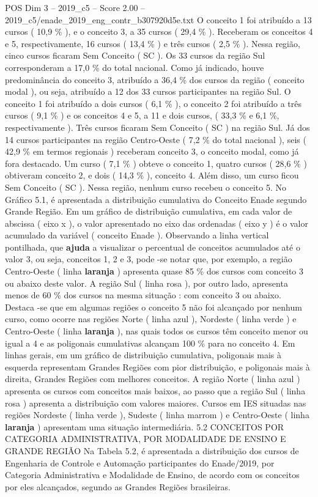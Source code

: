 \begin{textsample}{POS Dim 3 – 2019\_c5 – Score 2.00 – 2019\_c5/enade\_2019\_eng\_contr\_b307920d5e.txt}
O conceito 1 foi atribuído a 13 cursos ( 10,9 \% ), e o conceito 3, a 35 cursos ( 29,4 \% ).
Receberam os conceitos 4 e 5, respectivamente, 16 cursos ( 13,4 \% ) e três cursos ( 2,5 \% ).
Nessa região, cinco cursos ficaram Sem Conceito ( SC ).
Os 33 cursos da região Sul corresponderam a 17,0 \% do total nacional.
Como já indicado, houve predominância do conceito 3, atribuído a 36,4 \% dos cursos da região ( conceito modal ), ou seja, atribuído a 12 dos 33 cursos participantes na região Sul.
O conceito 1 foi atribuído a dois cursos ( 6,1 \% ), o conceito 2 foi atribuído a três cursos ( 9,1 \% ) e os conceitos 4 e 5, a 11 e dois cursos, ( 33,3 \% e 6,1 \%, respectivamente ).
Três cursos ficaram Sem Conceito ( SC ) na região Sul.
Já dos 14 cursos participantes na região Centro-Oeste ( 7,2 \% do total nacional ), seis ( 42,9 \% em termos regionais ) receberam conceito 3, o conceito modal, como já fora destacado.
Um curso ( 7,1 \% ) obteve o conceito 1, quatro cursos ( 28,6 \% ) obtiveram conceito 2, e dois ( 14,3 \% ), conceito 4.
Além disso, um curso ficou Sem Conceito ( SC ).
Nessa região, nenhum curso recebeu o conceito 5.
No Gráfico 5.1, é apresentada a distribuição cumulativa do Conceito Enade segundo Grande Região.
Em um gráfico de distribuição cumulativa, em cada valor de abscissa ( eixo x ), o valor apresentado no eixo das ordenadas ( eixo y ) é o valor acumulado da variável ( conceito Enade ).
Observando a linha vertical pontilhada, que \textbf{ajuda} a visualizar o percentual de conceitos acumulados até o valor 3, ou seja, conceitos 1, 2 e 3, pode -se notar que, por exemplo, a região Centro-Oeste ( linha \textbf{laranja} ) apresenta quase 85 \% dos cursos com conceito 3 ou abaixo deste valor.
A região Sul ( linha rosa ), por outro lado, apresenta menos de 60 \% dos cursos na mesma situação : com conceito 3 ou abaixo.
Destaca -se que em algumas regiões o conceito 5 não foi alcançado por nenhum curso, como ocorre nas regiões Norte ( linha azul ), Nordeste ( linha verde ) e Centro-Oeste ( linha \textbf{laranja} ), nas quais todos os cursos têm conceito menor ou igual a 4 e as poligonais cumulativas alcançam 100 \% para no conceito 4.
Em linhas gerais, em um gráfico de distribuição cumulativa, poligonais mais à esquerda representam Grandes Regiões com pior distribuição, e poligonais mais à direita, Grandes Regiões com melhores conceitos.
A região Norte ( linha azul ) apresenta os cursos com conceitos mais baixos, ao passo que a região Sul ( linha rosa ) apresenta a distribuição com valores maiores.
Cursos em IES situadas nas regiões Nordeste ( linha verde ), Sudeste ( linha marrom ) e Centro-Oeste ( linha \textbf{laranja} ) apresentam uma situação intermediária. 5.2 CONCEITOS POR CATEGORIA ADMINISTRATIVA, POR MODALIDADE DE ENSINO E GRANDE REGIÃO Na Tabela 5.2, é apresentada a distribuição dos cursos de Engenharia de Controle e Automação participantes do Enade/2019, por Categoria Administrativa e Modalidade de Ensino, de acordo com os conceitos por eles alcançados, segundo as Grandes Regiões brasileiras.

\end{textsample}
